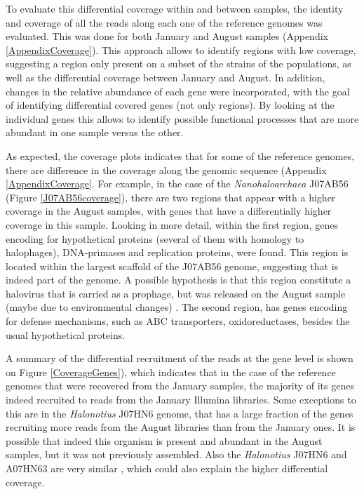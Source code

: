 To evaluate this differential coverage within and between samples, the identity and coverage of all the reads along each one of the reference genomes was evaluated. This was done for both January and August samples (Appendix \ref{AppendixCoverage}). This approach allows to identify regions with low coverage, suggesting a region only present on a subset of the strains of the populations, as well as the differential coverage between January and August. In addition, changes in the relative abundance of each gene were incorporated, with the goal of identifying differential covered genes (not only regions). By looking at the individual genes this allows to identify possible functional processes that are more abundant in one sample versus the other.

As expected, the coverage plots indicates that for some of the reference genomes, there are difference in the coverage along the genomic sequence (Appendix \ref{AppendixCoverage}. For example, in the case of the \textit{Nanohaloarchaea} J07AB56 (Figure \ref{J07AB56coverage}), there are two regions that appear with a higher coverage in the August samples, with genes that have a differentially higher coverage in this sample. Looking in more detail, within the first region, genes encoding for hypothetical proteins (several of them with homology to halophages), DNA-primases and replication proteins, were found. This region is located within the largest scaffold of the J07AB56 genome, suggesting that is indeed part of the genome. A possible hypothesis is that this region constitute a halovirus that is carried as a prophage, but was released on the August sample (maybe due to environmental changes) \cite{Porter:2007jw}. The second region, has genes encoding for defense mechanisms, such as ABC transporters, oxidoreductases, besides the usual hypothetical proteins.

A summary of the differential recruitment of the reads at the gene level is shown on Figure \ref{CoverageGenes}), which indicates that in the case of the reference genomes that were recovered from the January samples, the majority of its genes indeed recruited to reads from the January Illumina libraries. Some exceptions to this are in the \textit{Halonotius} J07HN6 genome, that has a large fraction of the genes recruiting more reads from the August libraries than from the January ones. It is possible that indeed this organism is present and abundant in the August samples, but it was not previously assembled. Also the \textit{Halonotius} J07HN6 and A07HN63 are very similar \cite{Podell:2013fp}, which could also explain the higher differential coverage.

